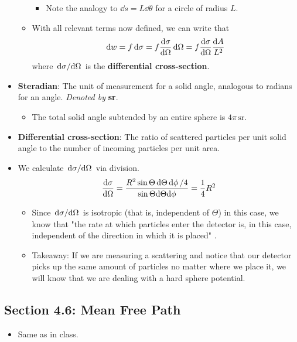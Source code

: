 \documentclass[../notes.tex]{subfiles}
\begin{document}
\begin{itemize}
\begin{itemize}
        \begin{itemize}
            \item Note the analogy to $\dd{s}=L\dd{\theta}$ for a circle of radius $L$.
        \end{itemize}
        \item With all relevant terms now defined, we can write that
        \begin{equation*}
            \dd{w} = f\dd{\sigma}
            = f\dv{\sigma}{\Omega}\dd{\Omega}
            = f\dv{\sigma}{\Omega}\frac{\dd{A}}{L^2}
        \end{equation*}
        where $\dv*{\sigma}{\Omega}$ is the \textbf{differential cross-section}.
    \end{itemize}
    \item \textbf{Steradian}: The unit of measurement for a solid angle, analogous to radians for an angle. \emph{Denoted by} \textbf{sr}.
    \begin{itemize}
        \item The total solid angle subtended by an entire sphere is $4\pi\,\si{\steradian}$.
    \end{itemize}
    \item \textbf{Differential cross-section}: The ratio of scattered particles per unit solid angle to the number of incoming particles per unit area.
    \item We calculate $\dv*{\sigma}{\Omega}$ via division.
    \begin{equation*}
        \dv{\sigma}{\Omega} = \frac{R^2\sin\Theta\dd{\Theta}\dd{\phi}/4}{\sin\Theta\dd\Theta\dd\phi} = \frac{1}{4}R^2
    \end{equation*}
    \begin{itemize}
        \item Since $\dv*{\sigma}{\Omega}$ is isotropic (that is, independent of $\Theta$) in this case, we know that "the rate at which particles enter the detector is, in this case, independent of the direction in which it is placed" \parencite[94]{bib:KibbleBerkshire}.
        \item Takeaway: If we are measuring a scattering and notice that our detector picks up the same amount of particles no matter where we place it, we will know that we are dealing with a hard sphere potential.
    \end{itemize}
\end{itemize}


\subsection*{Section 4.6: Mean Free Path}
\begin{itemize}
    \item Same as in class.
\end{itemize}
\end{document}
